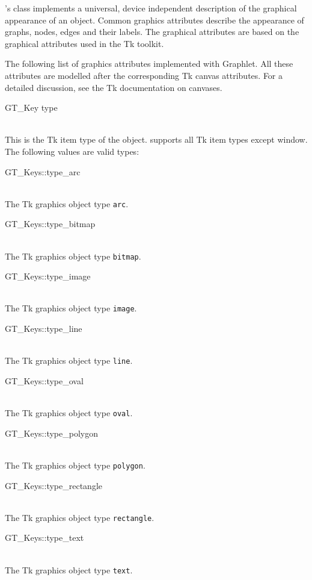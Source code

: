 \documentclass[twoside,fleqn]{report}
\begin{document}
\Graphlet{}'s class  implements a universal,
device independent description of the graphical appearance of an
object. Common graphics attributes describe the appearance of
graphs, nodes, edges and their labels.  The graphical attributes
are based on the graphical attributes used in the Tk toolkit.

The following list of graphics attributes implemented with
Graphlet.  All these attributes are modelled after the
corresponding Tk canvas attributes.  For a detailed discussion,
see the Tk documentation on canvases.

\begin{CAttributes}

  \item[GT\_Key type] \strut\\
  This is the Tk item type of the object.  \Graphlet{} supports all Tk 
  item types except window.  The following values are valid types:
  \begin{ttdescription}
    \item[GT\_Keys::type\_arc] \strut\\
    The Tk graphics object type \texttt{arc}.
    \item[GT\_Keys::type\_bitmap] \strut\\
    The Tk graphics object type \texttt{bitmap}.
    \item[GT\_Keys::type\_image] \strut\\
    The Tk graphics object type \texttt{image}.
    \item[GT\_Keys::type\_line] \strut\\
    The Tk graphics object type \texttt{line}.
    \item[GT\_Keys::type\_oval] \strut\\
    The Tk graphics object type \texttt{oval}.
    \item[GT\_Keys::type\_polygon] \strut\\
    The Tk graphics object type \texttt{polygon}.
    \item[GT\_Keys::type\_rectangle] \strut\\
    The Tk graphics object type \texttt{rectangle}.
    \item[GT\_Keys::type\_text] \strut\\
    The Tk graphics object type \texttt{text}.
  \end{ttdescription}
  

\end{CAttributes}
\end{document}
